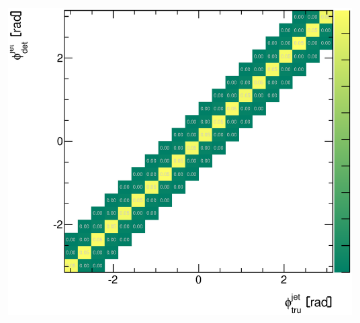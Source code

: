 \documentclass[12pt, twoside]{article}
\numberwithin{equation}{section}
\numberwithin{figure}{section}
\newenvironment{changemargin}[2]{%
\begin{list}{}{%
\setlength{\topsep}{0pt}%
\setlength{\leftmargin}{#1}%
\setlength{\rightmargin}{#2}%
\setlength{\listparindent}{\parindent}%
\setlength{\itemindent}{\parindent}%
\setlength{\parsep}{\parskip}%
}%
\item[]}{\end{list}}
\begin{document}
\begin{figure}
\begin{changemargin}{-1.0cm}{-0.75cm}
\begin{changemargin}{-0.75cm}{-1.0cm}
\begin{subfigure}[b]{0.37\textwidth}
            \subcaption{}
            \label{fig:SherpaCorrelationRapidityJet}
        \end{subfigure}
        \begin{subfigure}[b]{0.37\textwidth}
            \includegraphics[width=\textwidth]{./images/CorrelationMatricesSherpa/REC_vs_HAD-106.eps}
            \subcaption{}
            \label{fig:SherpaCorrelationPhiJet}
        \end{subfigure}


\end{changemargin}
\end{changemargin}
\end{figure}
\end{document}

